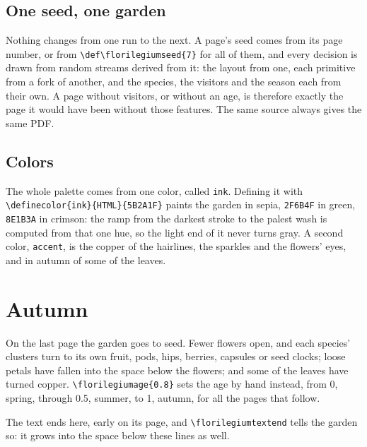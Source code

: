 \documentclass[11pt,a4paper]{article}
\newcommand\code[1]{\texttt{\small #1}}
\begin{document}
\subsection{One seed, one garden}

Nothing changes from one run to the next. A page's seed comes from its page number, or
from \code{\textbackslash def\textbackslash florilegiumseed\{7\}} for all of them, and
every decision is drawn from random streams derived from it: the layout from one, each
primitive from a fork of another, and the species, the visitors and the season each from
their own.
A page without visitors, or without an age, is therefore exactly the page it would have
been without those features. The same source always gives the same PDF.

\subsection{Colors}

The whole palette comes from one color, called \code{ink}. Defining it with
\code{\textbackslash definecolor\{ink\}\{HTML\}\{5B2A1F\}} paints the garden in sepia, \code{2F6B4F} in green, \code{8E1B3A} in crimson: the ramp from
the darkest stroke to the palest wash is computed from that one hue, so the light end of
it never turns gray. A second color, \code{accent}, is the copper of the hairlines, the
sparkles and the flowers' eyes, and in autumn of some of the leaves.

\section{Autumn}

On the last page the garden goes to seed. Fewer flowers open, and each species' clusters
turn to its own fruit, pods, hips, berries, capsules or seed clocks; loose petals have fallen
into the space below the flowers; and some of the leaves have turned copper.
\code{\textbackslash florilegiumage\{0.8\}} sets the age by hand instead, from 0, spring,
through 0.5, summer, to 1, autumn, for all the pages that follow.

The text ends here, early on its page, and \code{\textbackslash florilegiumtextend} tells
the garden so: it grows into the space below these lines as well.
\florilegiumtextend
\end{document}
